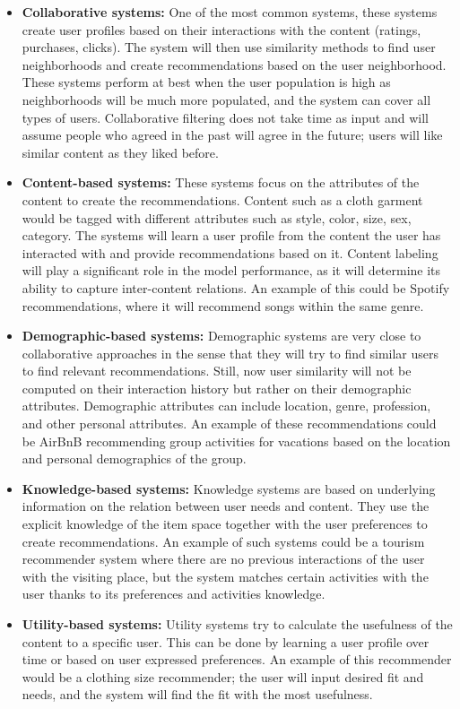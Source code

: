 \documentclass{kththesis}
\begin{document}
\begin{itemize}
    \item \textbf{Collaborative systems:} One of the most common systems, these systems create user profiles based on their interactions with the content (ratings, purchases, clicks). The system will then use similarity methods to find user neighborhoods and create recommendations based on the user neighborhood. These systems perform at best when the user population is high as neighborhoods will be much more populated, and the system can cover all types of users. Collaborative filtering does not take time as input and will assume people who agreed in the past will agree in the future; users will like similar content as they liked before.
    
    \item \textbf{Content-based systems:}  These systems focus on the attributes of the content to create the recommendations. Content such as a cloth garment would be tagged with different attributes such as style, color, size, sex, category. The systems will learn a user profile from the content the user has interacted with and provide recommendations based on it. Content labeling will play a significant role in the model performance, as it will determine its ability to capture inter-content relations. An example of this could be Spotify recommendations, where it will recommend songs within the same genre. 
    
    \item \textbf{Demographic-based systems:} Demographic systems are very close to collaborative approaches in the sense that they will try to find similar users to find relevant recommendations. Still, now user similarity will not be computed on their interaction history but rather on their demographic attributes. Demographic attributes can include location, genre, profession, and other personal attributes. An example of these recommendations could be AirBnB recommending group activities for vacations based on the location and personal demographics of the group.
    
    \item \textbf{Knowledge-based systems:} Knowledge systems are based on underlying information on the relation between user needs and content. They use the explicit knowledge of the item space together with the user preferences to create recommendations. An example of such systems could be a tourism recommender system where there are no previous interactions of the user with the visiting place, but the system matches certain activities with the user thanks to its preferences and activities knowledge.
    
    \item \textbf{Utility-based systems:} Utility systems try to calculate the usefulness of the content to a specific user. This can be done by learning a user profile over time or based on user expressed preferences. An example of this recommender would be a clothing size recommender; the user will input desired fit and needs, and the system will find the fit with the most usefulness.
    
\end{itemize}
\end{document}
